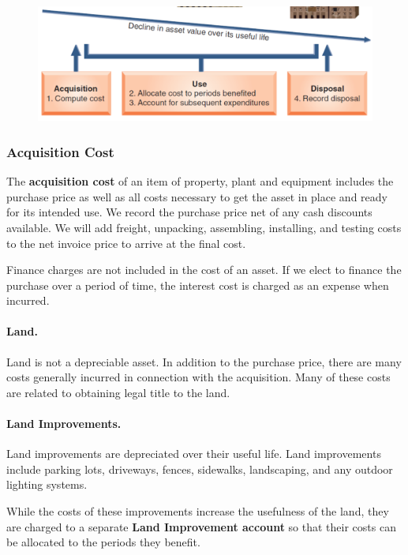 \documentclass[../main.tex]{subfiles}
\begin{document}
	\begin{figure}[ht]
		\centering
		\includegraphics[width=\columnwidth]{images/c8/ppe_costs.png}
	\end{figure}
	
	\subsubsection{Acquisition Cost}
	
	The \textbf{acquisition cost} of an item of property, plant and equipment 
	includes the purchase price as well as all costs necessary to get the asset 
	in place and ready for its intended use. We record the purchase price net 
	of any cash discounts available. We will add freight, unpacking, 
	assembling, installing, and testing costs to the net invoice price to 
	arrive at the final cost.
	
	Finance charges are not included in the cost of an asset. If we elect to 
	finance the purchase over a period of time, the interest cost is charged as 
	an expense when incurred.
	
	\paragraph{Land.} Land is not a depreciable asset. In addition to the 
	purchase price, there 
	are many costs generally incurred in connection with the acquisition. Many 
	of these costs are related to obtaining legal title to the land.
	
	\paragraph{Land Improvements.} Land improvements are depreciated over their 
	useful life. Land improvements 
	include parking lots, driveways, fences, sidewalks, landscaping, and any 
	outdoor lighting systems.
	
	While the costs of these improvements increase the usefulness of the land, 
	they are charged to a separate \textbf{Land Improvement account} so that 
	their costs 
	can be allocated to the periods they benefit.
	
\end{document}
